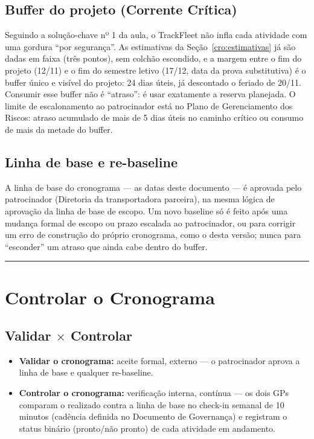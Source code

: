 \documentclass[11pt,a4paper]{article}
\newcommand{\separador}{\par\vspace{2mm}\hrule\vspace{4mm}}
\begin{document}
\subsection{Buffer do projeto (Corrente Crítica)}\label{cro:buffer}
Seguindo a solução-chave nº 1 da aula, o TrackFleet não infla cada atividade com uma gordura ``por segurança''. As estimativas da Seção~\ref{cro:estimativas} já são dadas em faixa (três pontos), sem colchão escondido, e a margem entre o fim do projeto (12/11) e o fim do semestre letivo (17/12, data da prova substitutiva) é o buffer único e visível do projeto: 24 dias úteis, já descontado o feriado de 20/11. Consumir esse buffer não é ``atraso'': é usar exatamente a reserva planejada. O limite de escalonamento ao patrocinador está no Plano de Gerenciamento dos Riscos: atraso acumulado de mais de 5 dias úteis no caminho crítico ou consumo de mais da metade do buffer.

\subsection{Linha de base e re-baseline}
A linha de base do cronograma --- as datas deste documento --- é aprovada pelo patrocinador (Diretoria da transportadora parceira), na mesma lógica de aprovação da linha de base de escopo. Um novo baseline só é feito após uma mudança formal de escopo ou prazo escalada ao patrocinador, ou para corrigir um erro de construção do próprio cronograma, como o desta versão; nunca para ``esconder'' um atraso que ainda cabe dentro do buffer.

\separador

\section{Controlar o Cronograma}\label{cro:controle}

\subsection{Validar $\times$ Controlar}
\begin{itemize}[itemsep=3pt]
  \item \textbf{Validar o cronograma:} aceite formal, externo --- o patrocinador aprova a linha de base e qualquer re-baseline.
  \item \textbf{Controlar o cronograma:} verificação interna, contínua --- os dois GPs comparam o realizado contra a linha de base no check-in semanal de 10 minutos (cadência definida no Documento de Governança) e registram o status binário (pronto/não pronto) de cada atividade em andamento.
\end{itemize}
\end{document}
